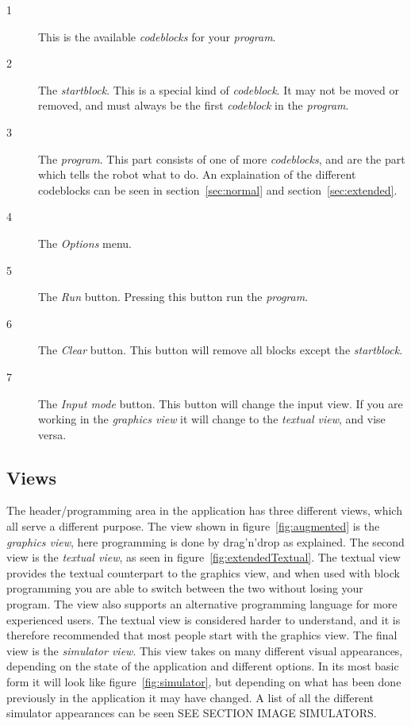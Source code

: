 \documentclass[12pt]{exam}
\begin{document}
	\begin{description}
		\item[1] This is the available \textit{codeblocks} for your \textit{program}.
		\item[2] The \textit{startblock}. This is a special kind of \textit{codeblock}. 
			It may not be moved or removed, and must always be the first \textit{codeblock} in the \textit{program}.
		\item[3] The \textit{program}. This part consists of one of more \textit{codeblocks}, and are the part which tells the robot what to do.
			An explaination of the different codeblocks can be seen in section~\ref{sec:normal} and section~\ref{sec:extended}.
		\item[4] The \textit{Options} menu. 
		\item[5] The \textit{Run} button. Pressing this button run the \textit{program}.
		\item[6] The \textit{Clear} button. This button will remove all blocks except the \textit{startblock}.
		\item[7] The \textit{Input mode} button. This button will change the input view. 
		If you are working in the \textit{graphics view} it will change to the \textit{textual view}, and vise versa.
	\end{description}
		
	\subsection{Views}
	The header/programming area in the application has three different views, which all serve a different purpose.
	The view shown in figure~\ref{fig:augmented} is the \textit{graphics view}, here programming is done by drag'n'drop as explained.
	The second view is the \textit{textual view}, as seen in figure~\ref{fig:extendedTextual}. 
	The textual view provides the textual counterpart to the graphics view, and when used with block programming you are able to switch between the two
	without losing your program. The view also supports an alternative programming language for more experienced users.
	The textual view is considered harder to understand, and it is therefore recommended that most people start with the graphics view.
	The final view is the \textit{simulator view}. This view takes on many different visual appearances, 
	depending on the state of the application and different options. In its most basic form it will look like figure~\ref{fig:simulator},
	but depending on what has been done previously in the application it may have changed. 
	A list of all the different simulator appearances can be seen SEE SECTION IMAGE SIMULATORS.
	
\end{document}
